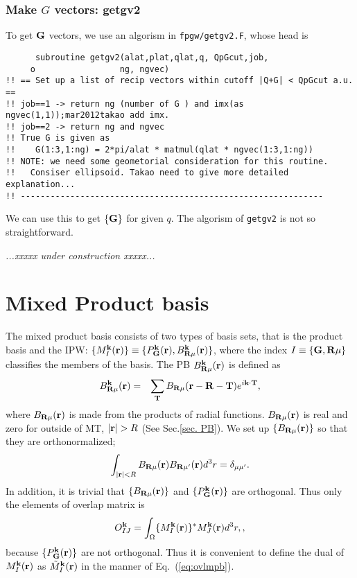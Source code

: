 \documentclass[a4paper,10pt,epsf,fleqn]{article}
\def\underconstruction{{\it...xxxxx under construction xxxxx...\\}}
\newcommand{\bfG}{{\bf G}}
\newcommand{\bfR}{{\bf R}}
\newcommand{\req}[1]{\mbox{Eq.~(\ref{#1})}}
\begin{document}
\subsubsection{Make $G$ vectors: getgv2}
To get $\bfG$ vectors, we use an algorism in \verb!fpgw/getgv2.F!, whose head
is
\begin{verbatim}
      subroutine getgv2(alat,plat,qlat,q, QpGcut,job,
     o                 ng, ngvec)
!! == Set up a list of recip vectors within cutoff |Q+G| < QpGcut a.u. ==
!! job==1 -> return ng (number of G ) and imx(as ngvec(1,1));mar2012takao add imx.
!! job==2 -> return ng and ngvec
!! True G is given as
!!    G(1:3,1:ng) = 2*pi/alat * matmul(qlat * ngvec(1:3,1:ng))
!! NOTE: we need some geometorial consideration for this routine.
!!   Consiser ellipsoid. Takao need to give more detailed explanation...
!! -------------------------------------------------------------
\end{verbatim}
We can use this to get $\{\bfG\}$ for given $q$.
The algorism of \verb!getgv2! is not so straightforward.

\underconstruction


\section{Mixed Product basis}
\label{sec:mpbsec}
The mixed product basis consists of two types of basis sets, that is 
the product basis and the IPW:
$\{M^{\bf k}_I({\bf r}) \}\equiv 
\{ P^{\bf k}_{\bf G}({\bf r}), B_{\bfR\mu}^{\bf k}({\bf r})\}$,
where the index $I\equiv \{ {\bf G},\bfR\mu\}$ 
classifies the members of the basis.
The PB $B^{\bf k}_{\bfR\mu}({\bf r})$ is defined as
\begin{eqnarray}
  B^{\bf k}_{\bfR\mu}({\bf r}) &=& 
          \sum_{\bf T} B_{\bfR\mu}({\bf r-R}-{\bf T}) e^{i {\bf k\cdot T}},
\end{eqnarray}
where $B_{\bfR\mu}({\bf r})$ is made from the products of radial functions.
$B_{\bfR\mu}({\bf r})$ is real and
zero for outside of MT, $|{\bf r}| > R$ (See Sec.\ref{sec. PB}).
We set up $\{B_{\bfR\mu}({\bf r})\}$ so that they are orthonormalized;
\begin{eqnarray}
  \int_{|{\bf r}| < R} B_{\bfR\mu}({\bf r}) B_{\bfR\mu'}({\bf r}) d^3r =
  \delta_{\mu \mu'}.
  \label{eq. PB-ortho}
\end{eqnarray}
In addition, it is trivial that $\{B_{\bfR\mu}({\bf r})\}$ and 
$\{ P^{\bf k}_{\bf G}({\bf r})\}$ are orthogonal.
Thus only the elements of overlap matrix is
\begin{eqnarray}
 O^{\bf k}_{IJ}= 
  \int_\Omega \{M_I^{\bf k}({\bf r})\}^* {M}_J^{\bf k}({\bf r}) d^3r,
  \label{eq. ovlp},
\end{eqnarray}
because $\{ P^{\bf k}_{\bf G}({\bf r})\}$
are not orthogonal.
Thus it is convenient to define the dual of ${M}^{\bf k}_{I}({\bf r})$ as
$\tilde{M}^{\bf k}_{I}({\bf r})$ in the manner of \req{eq:ovlmpb}.
\end{document}
